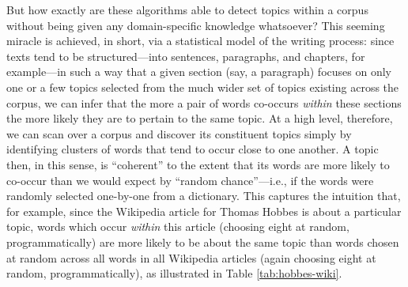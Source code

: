 \documentclass[11pt]{article}
\begin{document}

But how exactly are these algorithms able to detect topics within a corpus without being given any domain-specific knowledge whatsoever? This seeming miracle is achieved, in short, via a statistical model of the writing process: since texts tend to be structured---into sentences, paragraphs, and chapters, for example---in such a way that a given section (say, a paragraph) focuses on only one or a few topics selected from the much wider set of topics existing across the corpus, we can infer that the more a pair of words co-occurs \textit{within} these sections the more likely they are to pertain to the same topic. At a high level, therefore, we can scan over a corpus and discover its constituent topics simply by identifying clusters of words that tend to occur close to one another. A topic then, in this sense, is ``coherent'' to the extent that its words are more likely to co-occur than we would expect by ``random chance''---i.e., if the words were randomly selected one-by-one from a dictionary. This captures the intuition that, for example, since the Wikipedia article for Thomas Hobbes is about a particular topic, words which occur \textit{within} this article (choosing eight at random, programmatically) are more likely to be about the same topic than words chosen at random across all words in all Wikipedia articles (again choosing eight at random, programmatically), as illustrated in Table \ref{tab:hobbes-wiki}.

\end{document}
